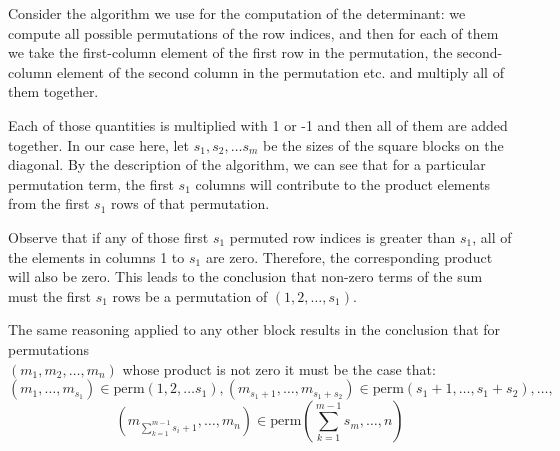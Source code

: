 \begin{solution}

    Consider the algorithm we use for the computation of the determinant: we compute all possible permutations of the row indices, and then for each of them we take the first-column element of the first row in the permutation, the second-column element of the second column in the permutation etc. and multiply all of them together.

    Each of those quantities is multiplied with 1 or -1 and then all of them are added together. In our case here, let $s_1, s_2, \ldots s_m$ be the sizes of the square blocks on the diagonal. By the description of the algorithm, we can see that for a particular permutation term, the first $s_1$ columns will contribute to the product elements from the first $s_1$ rows of that permutation.

    Observe that if any of those first $s_1$ permuted row indices is greater than $s_1$, all of the elements in columns 1 to $s_1$ are zero. Therefore, the corresponding product will also be zero. This leads to the conclusion that non-zero terms of the sum must the first $s_1$ rows be a permutation of $(1, 2, \ldots, s_1)$.

    The same reasoning applied to any other block results in the conclusion that for permutations \\ $(m_{1}, m_{2}, \ldots, m_{n})$ whose product is not zero it must be the case that:
    $$(m_{1}, \ldots, m_{s_1}) \in \text{perm}(1, 2, \ldots s_1), (m_{s_1+1}, \ldots, m_{s_1+s_2}) \in \text{perm}(s_1+1, \ldots, s_1+s_2), \ldots, $$ $$(m_{\sum_{k=1}^{m-1}s_i+1}, \ldots, m_{n}) \in \text{perm}(\sum_{k=1}^{m-1}s_m, \ldots, n)$$


\end{solution}
